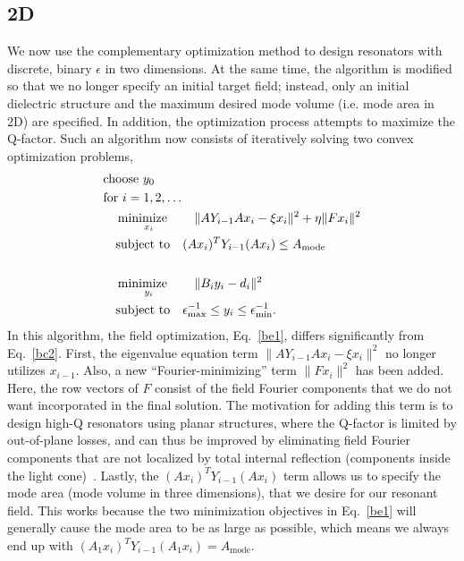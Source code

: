 \subsection{2D}

We now use the complementary optimization method to design resonators with discrete, binary $\epsilon$ in two dimensions. At the same time, the algorithm is modified so that we no longer specify an initial target field; instead, only an initial dielectric structure and the maximum desired mode volume (i.e. mode area in 2D) are specified. In addition, the optimization process attempts to maximize the Q-factor. Such an algorithm now consists of iteratively solving two convex optimization problems,
\begin{align}
&\text{choose $y_0$} \nonumber \\
&\text{for } i = 1, 2, \ldots \nonumber \\
&\quad\operatorname*{\text{minimize}\quad}_{x_i}\quad \|A Y_{i-1} A x_i - \xi x_{i}\|^2 +   \eta \|F x_i\|^2\nonumber \\
&\quad\text{subject to}\quad (A x_i)^T Y_{i-1} (A x_i) \leq A_\text{mode} \label{be1} \\
\nonumber \\
&\quad\operatorname*{\text{minimize}\quad}_{y_i}\quad \|B_i y_i-d_i\|^2 \nonumber \\
&\quad\text{subject to}\quad \epsilon_\text{max}^{-1} \leq y_i \leq \epsilon_\text{min}^{-1}. \label{be2} 
\end{align}
In this algorithm, the field optimization, Eq.~\eqref{be1}, differs significantly from Eq.~\eqref{bc2}. First, the eigenvalue equation term $\|A Y_{i-1} A x_i - \xi x_{i}\|^2$ no longer utilizes $x_{i-1}$. Also, a new ``Fourier-minimizing'' term $\|F x_i\|^2$ has been added. Here, the row vectors of $F$ consist of the field Fourier components that we do not want incorporated in the final solution. The motivation for adding this term is to design high-Q resonators using planar structures, where the Q-factor is limited by out-of-plane losses, and can thus be improved by eliminating field Fourier components that are not localized by total internal reflection (components inside the light cone)~\cite{Vuc05}. Lastly, the $(A x_i)^T Y_{i-1} (A x_i)$ term allows us to specify the mode area (mode volume in three dimensions), that we desire for our resonant field. This works because the two minimization objectives in Eq.~\eqref{be1} will generally cause the mode area to be as large as possible, which means we always end up with $(A_1 x_i)^T Y_{i-1} (A_1 x_i) = A_\text{mode}$.

